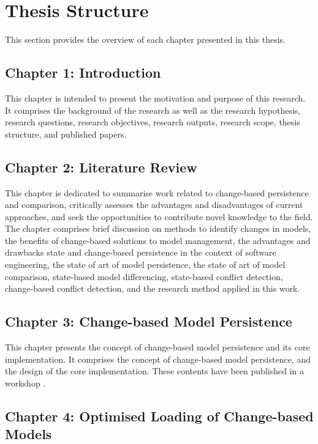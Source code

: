 \section{Thesis Structure}
\label{sec:Thesis Structure}
This section provides the overview of each chapter presented in this thesis.

\subsection{Chapter 1: Introduction}
\label{sec:chapter_1_introduction_plan}
This chapter is intended to present the motivation and purpose of this research. It comprises the background of the research as well as the research hypothesis, research questions, research objectives, research outputs, research scope, thesis structure, and published papers. 

\subsection{Chapter 2: Literature Review}
\label{sec:chapter_2_literature_review_plan}
This chapter is dedicated to summarise work related to change-based persistence and comparison, critically assesses the advantages and disadvantages of current approaches, and seek the opportunities to contribute novel knowledge to the field. The chapter comprises brief discussion on methods to identify changes in models, the benefits of change-based solutions to model management, the advantages and drawbacks state and change-based persistence in the context of software engineering, the state of art of model persistence, the state of art of model comparison, state-based model differencing, state-based conflict detection, change-based conflict detection, and the research method applied in this work.

\subsection{Chapter 3: Change-based Model Persistence}
\label{sec:chapter_3_Change-based_model_ersistence_plan}
This chapter presents the concept of change-based model persistence and its core implementation. It comprises the concept of change-based model persistence, and the design of the core implementation. These contents have been published in a workshop \cite{DBLP:conf/models/YohannisKP17}.


\subsection{Chapter 4: Optimised Loading of Change-based Models}
\label{sec:chapter_4_optimised_loading_change_based_model_persistence}

